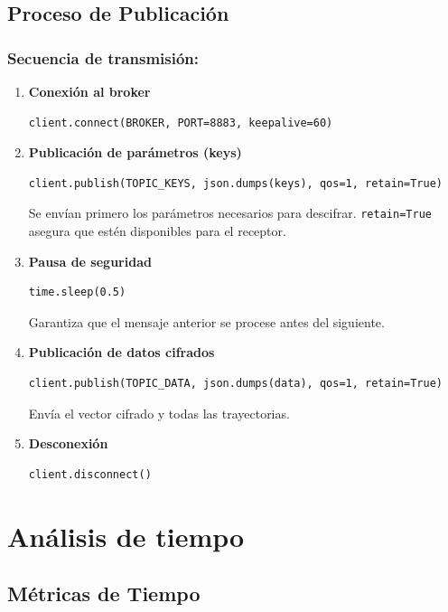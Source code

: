 \documentclass[12pt,a4paper]{article}
\begin{document}
	\subsection{Proceso de Publicación}
	
	\subsubsection*{Secuencia de transmisión:}
	
	\begin{enumerate}
		\item \textbf{Conexión al broker}
		\begin{lstlisting}
client.connect(BROKER, PORT=8883, keepalive=60)
		\end{lstlisting}
		
		\item \textbf{Publicación de parámetros (keys)}
		\begin{lstlisting}
client.publish(TOPIC_KEYS, json.dumps(keys), qos=1, retain=True)
		\end{lstlisting}
		Se envían primero los parámetros necesarios para descifrar. \texttt{retain=True} asegura que estén disponibles para el receptor.
		
		\item \textbf{Pausa de seguridad}
		\begin{lstlisting}
time.sleep(0.5)
		\end{lstlisting}
		Garantiza que el mensaje anterior se procese antes del siguiente.
		
		\item \textbf{Publicación de datos cifrados}
		\begin{lstlisting}
client.publish(TOPIC_DATA, json.dumps(data), qos=1, retain=True)
		\end{lstlisting}
		Envía el vector cifrado y todas las trayectorias.
		
		\item \textbf{Desconexión}
		\begin{lstlisting}
client.disconnect()
		\end{lstlisting}
	\end{enumerate}
	
	\section{Análisis de tiempo}
	
	\subsection{Métricas de Tiempo}
	
\end{document}
